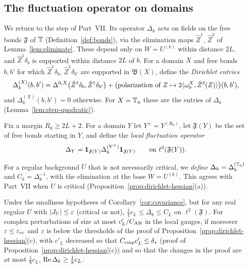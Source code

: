 \subsection{The fluctuation operator on domains}

We return to the step of Part~VII. Its operator $\Delta_k$ acts on fields on the free bonds $\mathfrak F$ of $\mathbb T$ (Definition~\ref{def:bonds}), via the elimination maps $\hat Z^1$, $\hat Z^2$ of Lemma~\ref{lem:eliminate}. These depend only on $W=U^{(k)}$ within distance $2L$, and $\hat Z^1\delta_b$ is supported within distance $2L$ of $b$. For a domain $X$ and free bonds $b,b'$ for which $\hat Z^1\delta_b$, $\hat Z^1\delta_{b'}$ are supported in $\mathfrak B(X)$, define the \emph{Dirichlet entries}
\[
\Delta^{(X)}_k(b,b')=\Delta^{0,X}\big(\hat Z^1\delta_b,\hat Z^1\delta_{b'}\big)+\big(\text{polarization of }Z\mapsto2\langle \omega_0^X,\hat Z^2(Z)\rangle\big)(b,b'),
\]
and $\Delta^{(X)}_k(b,b')=0$ otherwise. For $X=\mathbb T_\eta$ these are the entries of $\Delta_k$ (Lemma~\ref{lem:step-quadratic}).

Fix a margin $R_0\ge2L+2$. For a domain $Y$ let $Y^+=Y^{(R_0)}$, let $\mathfrak F(Y)$ be the set of free bonds starting in $Y$, and define the \emph{local fluctuation operator}
\[
\Delta_Y=\mathbf 1_{\mathfrak F(Y)}\Delta^{(Y^+)}_k\mathbf 1_{\mathfrak F(Y)}\qquad\text{on }\ell^2(\mathfrak F(Y)).
\]

For a regular background $U$ that is not necessarily critical, we \emph{define} $\Delta_k=\Delta^{(\mathbb T_\eta)}_k$ and $C_k=\Delta_k^{-1}$, with the elimination at the base $W=U^{(k)}$. This agrees with Part~VII when $U$ is critical (Proposition~\ref{prop:dirichlet-hessian}(a)).

\begin{lemma}\label{lem:coercive-general}
Under the smallness hypotheses of Corollary~\ref{cor:covariance}, but for any real regular $U$ with $|J_U|\le\varepsilon$ (critical or not), $\frac14c_L\le\Delta_k\le C_L$ on $\ell^2(\mathfrak F)$. For complex perturbations of size at most $c'_L/C_{\rm AB}$ in the local gauges, if moreover $\varepsilon\le\varepsilon_{\rm cc}$ and $\varepsilon$ is below the thresholds of the proof of Proposition~\ref{prop:dirichlet-hessian}(c), with $c'_L$ decreased so that $C_{\rm cmp}c'_L\le\delta_*$ (proof of Proposition~\ref{prop:dirichlet-hessian}(c)) and so that the changes in the proof are at most $\frac18c_L$, $\operatorname{Re}\Delta_k\ge\frac18c_L$.
\end{lemma}


